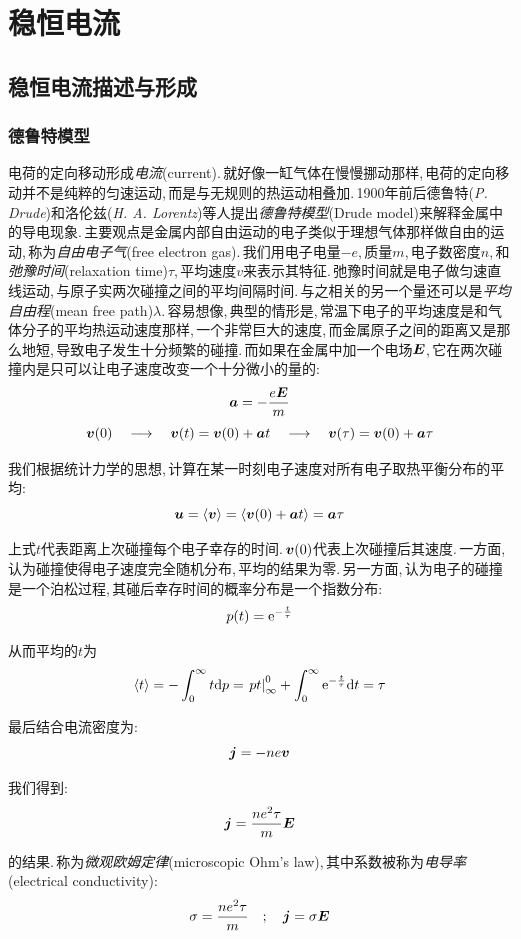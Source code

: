 \setcounter{chapter}{2}
\chapter{稳恒电流}


\section{稳恒电流描述与形成}
\subsection{德鲁特模型}
电荷的定向移动形成\emph{电流}(current).\,就好像一缸气体在慢慢挪动那样,\,电荷的定向移动并不是纯粹的匀速运动,\,而是与无规则的热运动相叠加.\,1900年前后德鲁特({\it P. Drude})和洛伦兹({\it H. A. Lorentz})等人提出\emph{德鲁特模型}(Drude model)来解释金属中的导电现象.\,主要观点是金属内部自由运动的电子类似于理想气体那样做自由的运动,\,称为\emph{自由电子气}(free electron gas).\,我们用电子电量$-e$,\,质量$m$,\,电子数密度$n$,\,和\emph{弛豫时间}(relaxation time)$\tau$,\,平均速度$v$来表示其特征.\,弛豫时间就是电子做匀速直线运动,\,与原子实两次碰撞之间的平均间隔时间.\,与之相关的另一个量还可以是\emph{平均自由程}(mean free path)$\lambda$.\,容易想像,\,典型的情形是,\,常温下电子的平均速度是和气体分子的平均热运动速度那样,\,一个非常巨大的速度,\,而金属原子之间的距离又是那么地短,\,导致电子发生十分频繁的碰撞.\,而如果在金属中加一个电场$\boldsymbol{E}$,\,它在两次碰撞内是只可以让电子速度改变一个十分微小的量的:
\[\boldsymbol{a}=-\frac{e\boldsymbol{E}}{m}\]
\[\boldsymbol{v}(0)\quad\longrightarrow\quad\boldsymbol{v}(t)=\boldsymbol{v}(0)+\boldsymbol{a}t\quad\longrightarrow\quad\boldsymbol{v}(\tau)=\boldsymbol{v}(0)+\boldsymbol{a}\tau\]

我们根据统计力学的思想,\,计算在某一时刻电子速度对所有电子取热平衡分布的平均:
\[\boldsymbol{u}=\langle\boldsymbol{v}\rangle=\langle\boldsymbol{v}(0) +\boldsymbol{a}t\rangle = \boldsymbol{a}\tau\]

上式$t$代表距离上次碰撞每个电子幸存的时间.\,$\boldsymbol{v}(0)$代表上次碰撞后其速度.\,一方面,\,认为碰撞使得电子速度完全随机分布,\,平均的结果为零.\,另一方面,\,认为电子的碰撞是一个泊松过程,\,其碰后幸存时间的概率分布是一个指数分布:
\[p(t)={\rm e}^{-\frac{t}{\tau}}\]

从而平均的$t$为
\[\langle t\rangle=-\int_0^\infty t\textrm{d} p=\left. pt\right|^0_\infty+\int_0^\infty {\rm e}^{-\frac{t}{\tau}} \textrm{d} t=\tau\]

最后结合电流密度为:
\[\boldsymbol{j}=-ne\boldsymbol{v}\]

我们得到:
\[\boldsymbol{j}=\frac{ne^2 \tau}{m}\boldsymbol{E}\]

的结果.\,称为\emph{微观欧姆定律}(microscopic Ohm's law),\,其中系数被称为\emph{电导率}(electrical conductivity):
\[\sigma=\frac{ne^2 \tau}{m}\quad;\quad \boldsymbol{j}=\sigma\boldsymbol{E}\]

